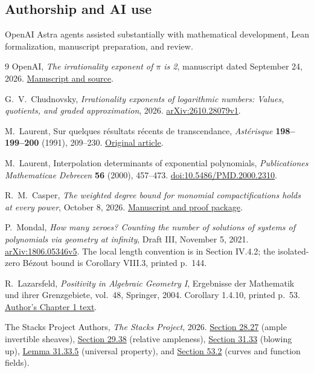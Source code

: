\documentclass[11pt]{article}
\theoremstyle{definition}
\theoremstyle{remark}
\numberwithin{equation}{section}
\begin{document}
\subsection*{Authorship and AI use}
OpenAI Astra agents assisted substantially with mathematical development,
Lean formalization, manuscript preparation, and review.
\begin{thebibliography}{9}
OpenAI, \emph{The irrationality exponent of \(\pi\) is 2},
manuscript dated September 24, 2026.
\href{https://github.com/openai/math/tree/fd4aeeb2ee4fc729c18d98444fed42fd0529eeeb/preprints/The-irrationality-exponent-of-pi-is-2-September-24-2026}{Manuscript and source}.

G.~V.~Chudnovsky, \emph{Irrationality exponents of logarithmic numbers:
Values, quotients, and graded approximation}, 2026.
\href{https://arxiv.org/abs/2610.28079v1}{arXiv:2610.28079v1}.

M.~Laurent, Sur quelques r\'esultats r\'ecents de transcendance,
\emph{Ast\'erisque} \textbf{198--199--200} (1991), 209--230.
\href{https://www.numdam.org/item/AST_1991__198-199-200__209_0/}{Original article}.

M.~Laurent, Interpolation determinants of exponential polynomials,
\emph{Publicationes Mathematicae Debrecen} \textbf{56} (2000),
457--473. \href{https://doi.org/10.5486/PMD.2000.2310}{doi:10.5486/PMD.2000.2310}.

R.~M.~Casper, \emph{The weighted degree bound for monomial compactifications
holds at every power}, October 8, 2026.
\href{https://github.com/Mattie/math/tree/4430312c0422ee667a0bf8a0d26c48e1bdda51b5/preprints/The-weighted-degree-bound-for-monomial-compactifications-holds-at-every-power-October-8-2026}{Manuscript and proof package}.

P.~Mondal, \emph{How many zeroes? Counting the number of solutions
of systems of polynomials via geometry at infinity}, Draft III,
November 5, 2021.
\href{https://arxiv.org/abs/1806.05346v5}{arXiv:1806.05346v5}.
The local length convention is in Section IV.4.2; the isolated-zero
B\'ezout bound is Corollary VIII.3, printed p.~144.

R.~Lazarsfeld, \emph{Positivity in Algebraic Geometry I},
Ergebnisse der Mathematik und ihrer Grenzgebiete, vol.~48,
Springer, 2004. Corollary 1.4.10, printed p.~53.
\href{https://www.math.stonybrook.edu/~roblaz/Reprints/Laz.PAG.Chapt1.pdf}{Author's Chapter 1 text}.

The Stacks Project Authors, \emph{The Stacks Project}, 2026.
\href{https://stacks.math.columbia.edu/tag/01PR}{Section 28.27}
(ample invertible sheaves),
\href{https://stacks.math.columbia.edu/tag/01VG}{Section 29.38}
(relative ampleness),
\href{https://stacks.math.columbia.edu/tag/01OF}{Section 31.33}
(blowing up),
\href{https://stacks.math.columbia.edu/tag/0806}{Lemma 31.33.5}
(universal property), and
\href{https://stacks.math.columbia.edu/tag/0BXX}{Section 53.2}
(curves and function fields).
\end{thebibliography}
\end{document}
